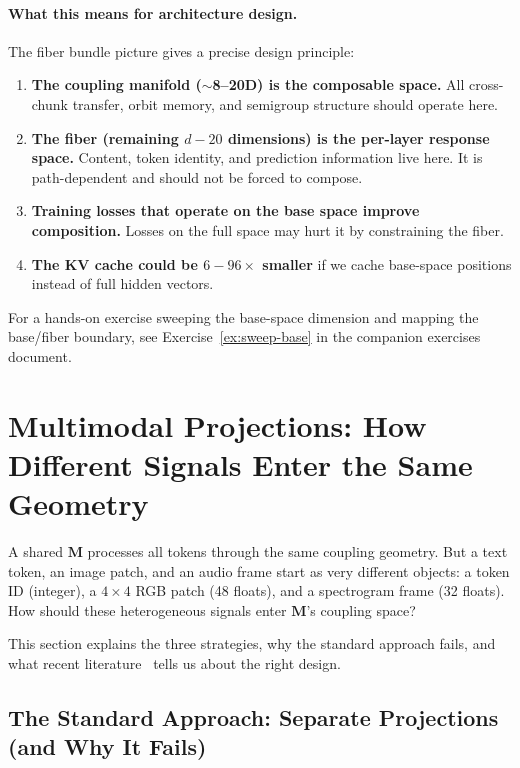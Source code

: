 \documentclass[11pt, a4paper]{article}
\newcommand{\M}{\mathbf{M}}
\theoremstyle{remark}
\begin{document}
\paragraph{What this means for architecture design.}
The fiber bundle picture gives a precise design principle:
\begin{enumerate}[nosep]
    \item \textbf{The coupling manifold ($\sim$8--20D) is the composable space.}  All cross-chunk transfer, orbit memory, and semigroup structure should operate here.
    \item \textbf{The fiber (remaining $d - 20$ dimensions) is the per-layer response space.} Content, token identity, and prediction information live here. It is path-dependent and should not be forced to compose.
    \item \textbf{Training losses that operate on the base space improve composition.} Losses on the full space may hurt it by constraining the fiber.
    \item \textbf{The KV cache could be $6{-}96\times$ smaller} if we cache base-space positions instead of full hidden vectors.
\end{enumerate}

For a hands-on exercise sweeping the base-space dimension and mapping the base/fiber boundary, see Exercise~\ref{ex:sweep-base} in the companion exercises document.

\section{Multimodal Projections: How Different Signals Enter the Same Geometry}
\label{sec:multimodal-projections}

A shared $\M$ processes all tokens through the same coupling geometry.
But a text token, an image patch, and an audio frame start as very different objects: a token ID (integer), a $4{\times}4$ RGB patch (48 floats), and a spectrogram frame (32 floats).
How should these heterogeneous signals enter $\M$'s coupling space?

This section explains the three strategies, why the standard approach fails, and what recent literature~\cite{zhang2023metatransformer, liang2024mot} tells us about the right design.

\subsection{The Standard Approach: Separate Projections (and Why It Fails)}
\end{document}
